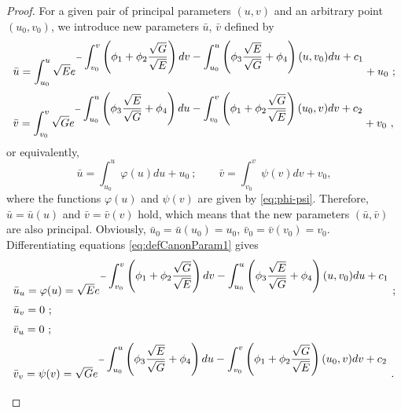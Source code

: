 \documentclass[12pt]{amsart}
\theoremstyle{definition}
\theoremstyle{remark}
\newcommand{\ds}{\displaystyle}
\numberwithin{equation}{section}
\begin{document}
\begin{proof}
	For a given  pair of principal parameters $(u,v)$ and an arbitrary point $(u_0,v_0)$, we introduce new parameters $\bar u$, $\bar v$ defined by
	\begin{equation*} \label{eq:defCanonParam}
		\begin{array}{l}
			\bar u=\ds\int_{u_0}^u\sqrt Ee^{-\ds\int_{v_0}^v\left(\phi_1+\phi_2\frac{\sqrt G}{\sqrt E}\right)dv
				-\int_{u_0}^u\left(\phi_3\frac{\sqrt E}{\sqrt G}+\phi_4\right)(u,v_0)du+c_1} +u_0 \vspace{2mm} \ ;\\
			\bar v=\ds\int_{v_0}^v\sqrt Ge^{-\ds\int_{u_0}^u\left(\phi_3\frac{\sqrt E}{\sqrt G}+\phi_4\right)du
				-\int_{v_0}^v\left(\phi_1+\phi_2\frac{\sqrt G}{\sqrt E}\right)(u_0,v)dv+c_2} +v_0 \ ,
		\end{array}
	\end{equation*}  
	or equivalently,
	\begin{equation} \label{eq:defCanonParam1}
	\bar u=\int_{u_0}^u \varphi(u) du +u_0 \ ;   \qquad  \bar v=\int_{v_0}^v \psi(v) dv +v_0 ,
		\end{equation}  
	where the functions $\varphi(u)$ and $\psi(v)$ are given by \eqref{eq:phi-psi}. Therefore,  $\bar u=\bar u(u)$ and $\bar v=\bar v(v)$ hold, which means that the new  parameters 
	$(\bar u, \bar v)$ are also principal. Obviously, $\bar u_0=\bar u(u_0)=u_0$, 
	$\bar v_0=\bar v(v_0)=v_0$. Differentiating  equations \eqref{eq:defCanonParam1} gives
	\begin{equation*} 
		\begin{array}{l} 
			\vspace{2mm}
	\bar u_u = \varphi(u) =\sqrt Ee^{-\ds\int_{v_0}^v\left(\phi_1+\phi_2\frac{\sqrt G}{\sqrt E}\right)dv
		-\int_{u_0}^u\left(\phi_3\frac{\sqrt {E}}{\sqrt {G}}+\phi_4\right)(u,v_0)du+c_1} \ ;\\
			\vspace{2mm}
	\bar u_v = 0 \ ;\\
	\vspace{2mm}
	\bar v_u = 0 \ ;\\
	\vspace{2mm}
	\bar v_v = \psi(v) =\sqrt Ge^{-\ds\int_{u_0}^u\left(\phi_3\frac{\sqrt E}{\sqrt G}+\phi_4\right)du
		-\int_{v_0}^v\left(\phi_1+\phi_2\frac{\sqrt G}{\sqrt E}\right)(u_0,v)dv+c_2} \ .
	\end{array}   
	\end{equation*}
	

\end{proof}
\end{document}

